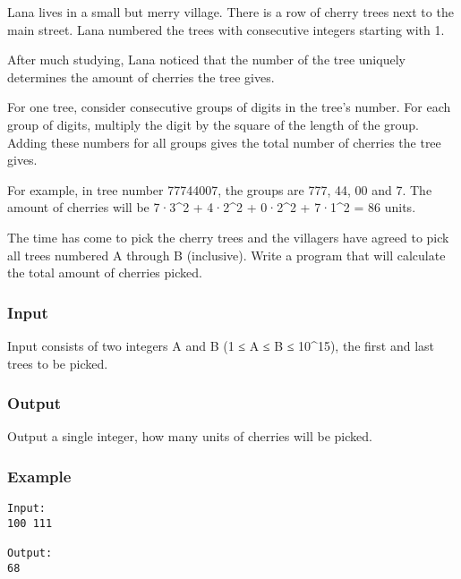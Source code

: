 



   Lana lives in a small but merry village. There is a row of cherry trees next to the main street. Lana numbered the trees with consecutive integers starting with 1.  

   After much studying, Lana noticed that the number of the tree uniquely determines the amount of cherries the tree gives.  

   For one tree, consider consecutive groups of digits in the tree's number. For each group of digits, multiply the digit by the square of the length of the group. Adding these numbers for all groups gives the total number of cherries the tree gives.  

   For example, in tree number 77744007, the groups are 777, 44, 00 and 7. The amount of cherries will be 7·3^2 + 4·2^2 + 0·2^2 + 7·1^2 = 86 units.  

   The time has come to pick the cherry trees and the villagers have agreed to pick all trees numbered A through B (inclusive). Write a program that will calculate the total amount of cherries picked.  

\subsubsection{   Input  }

   Input consists of two integers A and B (1 ≤ A ≤ B ≤ 10^15), the first and last trees to be picked.  

\subsubsection{   Output  }

   Output a single integer, how many units of cherries will be picked.  

\subsubsection{   Example  }
\begin{verbatim}
Input:
100 111

Output:
68
\end{verbatim}

